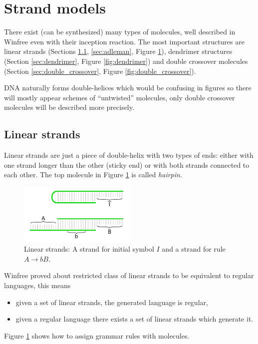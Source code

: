 
\section{Strand models}
	
	There exist (can be synthesized) many types of molecules, well described in Winfree \cite{winfree_comp} even with their inception reaction. The most important structures are linear strands (Sections \ref{sec:lin_strands}, \ref{sec:adleman}, Figure \ref{fig:linear}), dendrimer structures (Section \ref{sec:dendrimer}, Figure \ref{fig:dendrimer}) and double crossover molecules (Section \ref{sec:double_crossover}, Figure \ref{fig:double_crossover}).
	\begin{note}\label{note:untwist}
		DNA naturally forms double-helices which would be confusing in figures so there will mostly appear schemes of ``untwisted'' molecules, only double crossover molecules will be described more precisely. %
	\end{note}
	
	\subsection{Linear strands}
	\label{sec:lin_strands}
		
		Linear strands are just a piece of double-helix with two types of ends: either with one strand longer than the other (sticky end) or with both strands connected to each other. The top molecule in Figure \ref{fig:linear} is called {\em hairpin}.
		\begin{figure}[H]
		\begin{center}
			\includegraphics[width=0.502\textwidth]{./figures/strand_types/linear.pdf} %
			\caption{Linear strands: A strand for initial symbol $I$ and a strand for rule $A\rightarrow bB$.}
			\label{fig:linear}
		\end{center}
		\end{figure}
		Winfree \cite{winfree_phd} proved about restricted class of linear strands to be equivalent to regular languages, this means
		\begin{itemize}
			\item given a set of linear strands, the generated language is regular,
			\item given a regular language there exists a set of linear strands which generate it.
		\end{itemize}
		Figure \ref{fig:linear} shows how to assign grammar rules with molecules.
	
